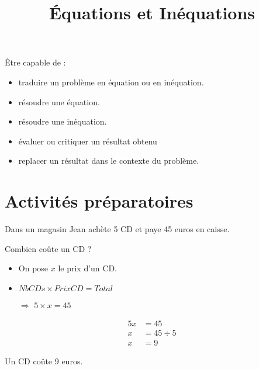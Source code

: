 \documentclass[12pt,a4paper]{article}
\date{}
\title{\'Equations et Inéquations}
\begin{document}



\begin{myobj}
	Être capable de :
	\begin{itemize}
		\item traduire un problème en équation ou en inéquation.
		\item résoudre une équation.
		\item résoudre une inéquation.
		\item évaluer ou critiquer un résultat obtenu
		\item replacer un résultat dans le contexte du problème.
	\end{itemize}
\end{myobj}

\section*{Activités préparatoires}

\begin{myact}{1}
	Dans un magasin Jean achète 5 CD et paye 45 euros en caisse. 
	
	Combien coûte un CD ?
\end{myact}

\begin{myrep}
	
		\begin{itemize}
			\item On pose $x$ le prix d'un CD.
			\item $NbCDs \times PrixCD = Total$
			\item[$\Rightarrow$] $5 \times x = 45$ 
		\end{itemize}
		
		\begin{align*}
			5x &= 45 \\
			x &= 45 \div 5\\
			x &= 9
		\end{align*}
	
	Un CD coûte 9 euros.
	
\end{myrep}
\end{document}
